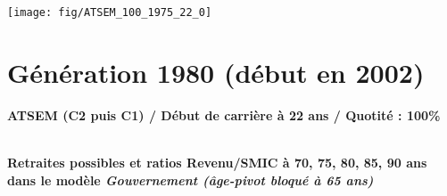  \vspace{0.1cm} 

 {\hspace{-2.2cm}\texttt{[image: fig/ATSEM\_100\_1975\_22\_0]}} 

\newpage 
 
\section{Génération 1980 (début en 2002)\label{ATSEM_100_1980_22_0}} 
 
{\bf \noindent ATSEM (C2 puis C1) / Début de carrière à 22 ans / Quotité : 100\%}  ~ 

 ~\\{\bf \noindent Retraites possibles et ratios Revenu/SMIC à 70, 75, 80, 85, 90 ans dans le modèle \emph{Gouvernement (âge-pivot bloqué à 65 ans)}}  
 
